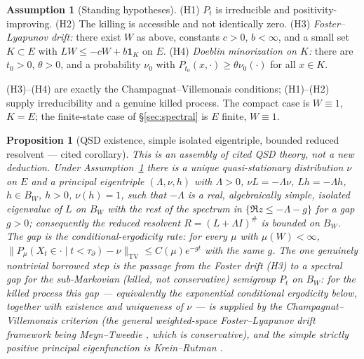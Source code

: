 \documentclass[11pt,reqno]{amsart}
\theoremstyle{plain}
\newtheorem{proposition}[theorem]{Proposition}
\theoremstyle{definition}
\newtheorem{assumption}[theorem]{Assumption}
\theoremstyle{remark}
\begin{document}
\begin{assumption}[Standing hypotheses]\label{ass:infinite}
\textup{(H1)} $P_t$ is irreducible and positivity-improving. \textup{(H2)} The
killing is accessible and not identically zero. \textup{(H3)} \emph{Foster--Lyapunov
drift:} there exist $W$ as above, constants $c>0$, $b<\infty$, and a small set
$K\subset E$ with $LW\le-cW+b\mathbf 1_K$ on $E$. \textup{(H4)} \emph{Doeblin
minorization on $K$:} there are $t_0>0$, $\theta>0$, and a probability $\nu_0$ with
$P_{t_0}(x,\cdot)\ge\theta\nu_0(\cdot)$ for all $x\in K$.
\end{assumption}

(H3)--(H4) are exactly the Champagnat--Villemonais conditions; (H1)--(H2) supply
irreducibility and a genuine killed process. The compact case is $W\equiv1$, $K=E$;
the finite-state case of \S\ref{sec:spectral} is $E$ finite, $W\equiv1$.

\begin{proposition}[QSD existence, simple isolated eigentriple, bounded reduced resolvent --- cited corollary]\label{thm:inf-exist}
This is an assembly of cited QSD theory, not a new deduction. Under
Assumption~\ref{ass:infinite} there is a unique quasi-stationary distribution $\nu$ on
$E$ and a principal eigentriple $(\Lambda,\nu,h)$ with $\Lambda>0$, $\nu L=-\Lambda\nu$,
$Lh=-\Lambda h$, $h\in B_W$, $h>0$, $\nu(h)=1$, such that $-\Lambda$ is a real,
algebraically simple, isolated eigenvalue of $L$ on $B_W$ with the rest of the spectrum
in $\{\Re z\le-\Lambda-g\}$ for a gap $g>0$; consequently the reduced resolvent
$R=(L+\Lambda I)^{\#}$ is bounded on $B_W$. The gap \emph{is} the conditional-ergodicity
rate: for every $\mu$ with $\mu(W)<\infty$,
$\|P_\mu(X_t\in\cdot\mid t<\tau_\partial)-\nu\|_{\mathrm{TV}}\le C(\mu)e^{-gt}$ with the
same $g$. The one genuinely nontrivial borrowed step is the passage from the Foster drift
\textup{(H3)} to a spectral gap for the \emph{sub-Markovian} (killed, not conservative)
semigroup $P_t$ on $B_W$: for the killed process this gap --- equivalently the exponential
conditional ergodicity below, together with existence and uniqueness of $\nu$ --- is supplied by the
Champagnat--Villemonais criterion \cite{ChampagnatVillemonais2016,ChampagnatVillemonais2017} (the
general weighted-space Foster--Lyapunov drift framework being Meyn--Tweedie \cite{MeynTweedie2009},
which is conservative), and the simple strictly positive principal eigenfunction is Krein--Rutman
\cite{KreinRutman1948}.
\end{proposition}
\end{document}
